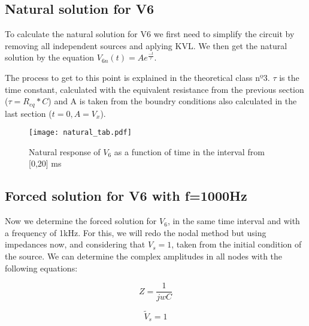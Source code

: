 \subsection{Natural solution for V6}

To calculate the natural solution for V6 we first need to simplify the circuit by removing all independent sources and aplying KVL. We then get the natural solution by the equation $V_{6n}(t)=Ae^{\frac{-t}{\tau}}$.

The process to get to this point is explained in the theoretical class nº3. $\tau$ is the time constant, calculated with the equivalent resistance from the previous section ($\tau=R_{eq}*C$) and A is taken from the boundry conditions also calculated in the last section ($t=0, A=V_x$).





\begin{figure}[H] \centering
\texttt{[image: natural\_tab.pdf]} 
\vspace{10px}
\caption{Natural response of $V_6$ as a function of time in the interval from [0,20] ms}
\label{fig:natural}
\end{figure} 

\subsection{Forced solution for V6 with f=1000Hz}
Now we determine the forced solution for $V_6$, in the same time interval and with a frequency of 1kHz. For this, we will redo the nodal method but using impedances now, and considering that $V_s=1$, taken from the initial condition of the source. We can determine the complex amplitudes in all nodes with the following equations:

\begin {equation}
	Z = \frac{1}{j w C}
	\label{eq:Z}
\end{equation}

\begin {equation}
	\tilde{V}_s = 1
	\label{eq:vs}
\end{equation}

